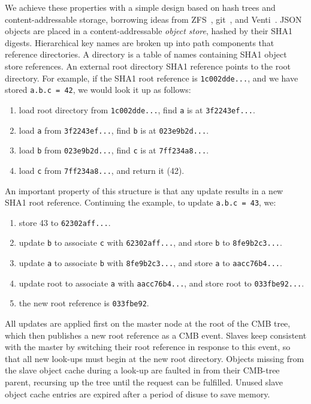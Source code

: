 We achieve these properties with a simple design based on hash trees
and content-addressable storage, borrowing ideas from
ZFS~\cite{Bonwick03thezettabyte}, git~\cite{Chacon:2009:PG:1618548}, and
Venti~\cite{Quinlan:2002:VNA:645371.651321}.
JSON objects are placed in a content-addressable
{\em object store}, hashed by their SHA1 digests.
Hierarchical key names are broken up into path components that reference
directories.
A directory is a table of names containing SHA1 object store references.
An external root directory SHA1 reference points to the root directory.
For example, if the SHA1 root reference is {\tt 1c002dde...}, and we have
stored {\tt a.b.c = 42}, we would look it up as follows:
\begin{enumerate}
\item{load root directory from {\tt 1c002dde...}, find {\tt a} is at
{\tt 3f2243ef...}.}
\item{load {\tt a} from {\tt 3f2243ef...}, find {\tt b} is at
{\tt 023e9b2d...}.}
\item{load {\tt b} from {\tt 023e9b2d...}, find {\tt c} is at
{\tt 7ff234a8...}.}
\item{load {\tt c} from {\tt 7ff234a8...}, and return it (42).}
\end{enumerate}

An important property of this structure is that any update results
in a new SHA1 root reference.  Continuing the example, to update {\tt a.b.c = 43}, we:
\begin{enumerate}
\item{store 43 to {\tt 62302aff...}.}
\item{update {\tt b} to associate {\tt c} with {\tt 62302aff...}, and store {\tt b} to {\tt 8fe9b2c3...}.}
\item{update {\tt a} to associate {\tt b} with {\tt 8fe9b2c3...}, and store {\tt a} to {\tt aacc76b4...}.}
\item{update root to associate {\tt a} with {\tt aacc76b4...}, and store root to {\tt 033fbe92...}.}
\item{the new root reference is {\tt 033fbe92}.}
\end{enumerate}


All updates are applied first on the master node at the root of the
CMB tree, which then publishes a new root reference as a CMB event.
Slaves keep consistent with the master by switching their root reference
in response to this event, so that all new look-ups must begin at the
new root directory.  Objects missing from the slave object cache during
a look-up are faulted in from their CMB-tree parent, recursing up the tree
until the request can be fulfilled.  Unused slave object cache entries are
expired after a period of disuse to save memory.

